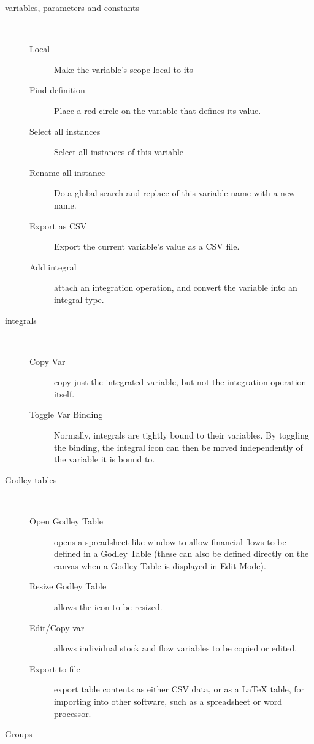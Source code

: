 \begin{description}
\item [{variables, parameters and constants}] %
\mbox{%
%
} 
\begin{description}
\item [{Local}] Make the variable's scope local to its  
\item [{Find definition}] Place a red circle on the variable that defines
its value. 
\item [{Select all instances}] Select all instances of this variable 
\item [{Rename all instance}] Do a global search and replace of this variable
name with a new name. 
\item [{Export as CSV}] Export the current variable's value as a CSV file.
\item [{Add integral}] attach an integration operation, and convert the
variable into an integral type.
\end{description}
\item [{integrals}] %
\mbox{%
%
} 
\begin{description}
\item [{Copy Var}] copy just the integrated variable, but not the integration
operation itself.
\item [{Toggle Var Binding}] Normally, integrals are tightly bound to
their variables. By toggling the binding, the integral icon can then
be moved independently of the variable it is bound to. 
\end{description}
\item [{Godley tables}] %
\mbox{%
%
} 
\begin{description}
\item [{Open Godley Table}] opens a spreadsheet-like window to allow financial
flows to be defined in a Godley Table (these can also be defined directly
on the canvas when a Godley Table is displayed in Edit Mode).
\item [{Resize Godley Table}] allows the icon to be resized. 
\item [{Edit/Copy var}] allows individual stock and flow variables to
be copied or edited. 
\item [{Export to file}] export table contents as either CSV data, or
as a \LaTeX{} table, for importing into other software, such as a spreadsheet
or word processor. 
\end{description}
\item [{Groups}] %
\mbox{%
%
} 
\begin{description}

\end{description}
\end{description}
